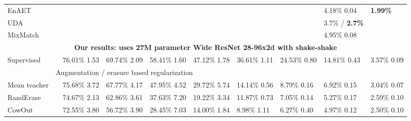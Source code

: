 \documentclass{article}
\newcommand{\eb}[1]{\scriptsize\,\,#1}
\begin{document}
\begin{table*}[t]
\begin{center}
{\begin{tabular}{@{ }llllllllll@{ }}
EnAET          &              &       &      &                      &                      &                      &                      & \hphantom{0}4.18\%\eb{0.04}      &  \bf\hphantom{0}1.99\% \\ 
UDA            &              &       &      &                      &                      &                      &                      & \hphantom{0}3.7\% / \bf2.7\%      &  \\ 
MixMatch       &              &       &      &                      &                      &                      &                      & \hphantom{0}4.95\%\eb{0.08}      &  \\ 

\multicolumn{10}{c}{\footnotesize{\textbf{Our results: uses 27M parameter Wide ResNet 28-96x2d with shake-shake}}}\\
Supervised            &              & 76.01\%\eb{1.53}      & 69.74\%\eb{2.09}      & 58.41\%\eb{1.60}      & 47.12\%\eb{1.78}      & 36.61\%\eb{1.11}      & 24.53\%\eb{0.80}      & 14.81\%\eb{0.43}      & \hphantom{0}3.57\%\eb{0.09} \\ 

&\multicolumn{9}{l}{\footnotesize{Augmentation / erasure based regularization}}\\
Mean teacher          &              & 75.68\%\eb{3.72}      & 67.77\%\eb{4.17}      & 47.95\%\eb{4.52}      & 29.72\%\eb{5.74}      & 14.14\%\eb{0.56}      & \hphantom{0}8.79\%\eb{0.16}      & \hphantom{0}6.92\%\eb{0.15}      & \hphantom{0}3.04\%\eb{0.07} \\ 
RandErase             &              & 74.67\%\eb{2.13}      & 62.86\%\eb{3.61}      & 37.63\%\eb{7.20}      & 19.22\%\eb{3.34}      & 11.87\%\eb{0.73}      & \hphantom{0}7.05\%\eb{0.14}      & \hphantom{0}5.27\%\eb{0.17}      & \hphantom{0}2.59\%\eb{0.10} \\ 
CowOut                &              & 72.55\%\eb{3.80}      & 56.72\%\eb{3.90}      & 28.45\%\eb{7.03}      & 14.00\%\eb{1.84}      & \hphantom{0}8.98\%\eb{1.11}      & \hphantom{0}6.27\%\eb{0.40}      & \hphantom{0}4.97\%\eb{0.12}      & \hphantom{0}2.50\%\eb{0.10} \\ 


\end{tabular}}
\end{center}
\end{table*}
\end{document}
